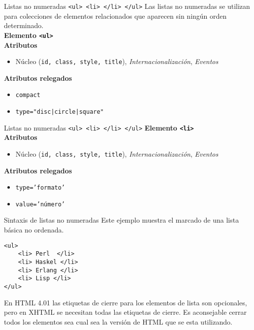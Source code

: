\begin{frame}{Listas no numeradas \texttt{<ul> <li> </li> </ul>}} %
    Las listas no numeradas se utilizan para colecciones de elementos
    relacionados que aparecen sin ningún orden determinado. \\[0.5cm]

    \textbf{Elemento \texttt{<ul>}}\\[0.2cm] 

    \textbf{Atributos}
    \begin{itemize}
        \item Núcleo (\texttt{id, class, style, title}),
        \textit{Internacionalización},  \textit{Eventos}
    \end{itemize}

    \textbf{Atributos relegados}
    \begin{itemize}
        \item \texttt{compact} 
        \item \texttt{type="disc|circle|square"}
    \end{itemize}
\end{frame}


\begin{frame}{Listas no numeradas \texttt{<ul> <li> </li> </ul>}} %
    \textbf{Elemento \texttt{<li>}}\\[0.2cm] 

    \textbf{Atributos}
    \begin{itemize}
        \item Núcleo (\texttt{id, class, style, title}),
        \textit{Internacionalización},  \textit{Eventos}
    \end{itemize}

    \textbf{Atributos relegados}
    \begin{itemize}
        \item \texttt{type='formato'} 
        \item \texttt{value='número'}
    \end{itemize}
\end{frame}

\begin{frame}[fragile]{Sintaxis de listas no numeradas} %
    Este ejemplo muestra el marcado de una lista básica no ordenada. 

    \begin{lstlisting}
<ul> 
    <li> Perl  </li>
    <li> Haskel </li> 
    <li> Erlang </li>
    <li> Lisp </li> 
</ul>
    \end{lstlisting}

    En HTML 4.01 las etiquetas de cierre para los elementos de lista son
    opcionales, pero en XHTML se necesitan todas las etiquetas de cierre. Es
    aconsejable cerrar todos los elementos sea cual sea la versión de HTML que
    se esta utilizando.
\end{frame}

